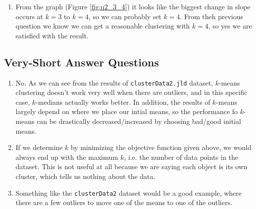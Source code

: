 \documentclass{article}
\def\enum#1{\begin{enumerate}#1\end{enumerate}}
\begin{document}
\begin{enumerate}
\begin{verbatim}
        # Optionally visualize the algorithm steps
        if doPlot && d == 2
            clustering2Dplot(X,y,W)
            sleep(.1)
        end
    
        error = kMediansError(X,y,W);
        @printf("Running k-medians, error = %d\n",error)
    end
    
    function predict(Xhat)
        (t,d) = size(Xhat)
    
        D = LOneNorms(Xhat,W)
    
        yhat = zeros(Int64,t)
        for i in 1:t
            (~,yhat[i]) = findmin(D[i,:])
        end
        return yhat
    end
    
    return PartitionModel(predict,y,W,error)
    end
\end{verbatim}
\item From the graph (Figure \ref{fig:q2_3_4}) it looks like the biggest change in slope occurs at $k=3$ to $k=4$, so we can probably set $k = 4$. From theh previous question we know we can get a reasonable clustering with $k=4$, so yes we are satisfied with the result.
\end{enumerate}

\subsection{Very-Short Answer Questions}

\enum{
\item No. As we can see from the results of \texttt{clusterData2.jld} dataset, $k$-means clustering doesn't work very well when there are outliers, and in this specific case, $k$-medians actually works better. In addition, the results of $k$-means largely depend on where we place our intial means, so the performance fo $k$-means can be drastically decreased/increased by choosing bad/good initial means.
\item If we determine $k$ by minimizing the objective function given above, we would always end up with the maximum $k$, i.e. the number of data points in the dataset. This is not useful at all because we are saying each object is its own cluster, which tells us nothing about the data.
\item Something like the \texttt{clusterData2} dataset would be a good example, where there are a few outliers to move one of the means to one of the outliers.
}
\end{document}
